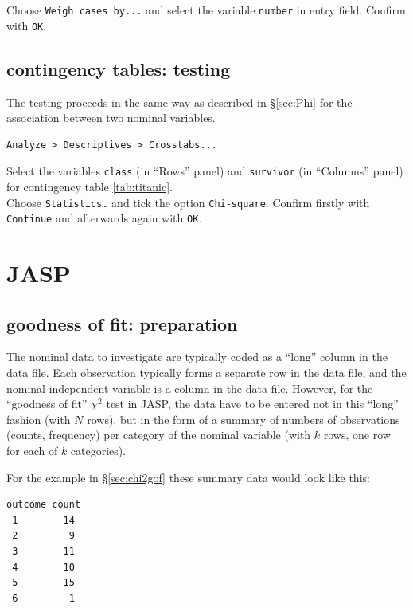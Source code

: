 \documentclass[
]{book}
\begin{document}
Choose \texttt{Weigh\ cases\ by...} and select the variable \texttt{number} in
entry field. Confirm with \texttt{OK}.

\hypertarget{contingency-tables-testing}{%
\subsection{contingency tables: testing}\label{contingency-tables-testing}}

The testing proceeds in the same way as described in
§\ref{sec:Phi} for
the association between two nominal variables.

\begin{verbatim}
Analyze > Descriptives > Crosstabs...
\end{verbatim}

Select the variables \texttt{class} (in ``Rows'' panel) and \texttt{survivor} (in
``Columns'' panel) for
contingency table \ref{tab:titanic}.\\
Choose \texttt{Statistics\ldots{}} and tick the option \texttt{Chi-square}. Confirm firstly with
\texttt{Continue} and afterwards again with \texttt{OK}.

\hypertarget{jasp-15}{%
\section{JASP}\label{jasp-15}}

\hypertarget{goodness-of-fit-preparation-1}{%
\subsection{goodness of fit: preparation}\label{goodness-of-fit-preparation-1}}

The nominal data to investigate are typically coded as a ``long'' column in the data file. Each observation typically forms a separate row in the data file, and the nominal independent variable is a column in the data file. However, for the ``goodness of fit'' \(\chi^2\) test in JASP, the data have to be entered not in this ``long'' fashion (with \(N\) rows), but in the form of a summary of numbers of observations (counts, frequency) per category of the nominal variable (with \(k\) rows, one row for each of \(k\) categories).

For the example in §\ref{sec:chi2gof} these summary data would look like this:

\begin{verbatim}
outcome count
 1        14
 2         9
 3        11
 4        10
 5        15
 6         1
\end{verbatim}
\end{document}
